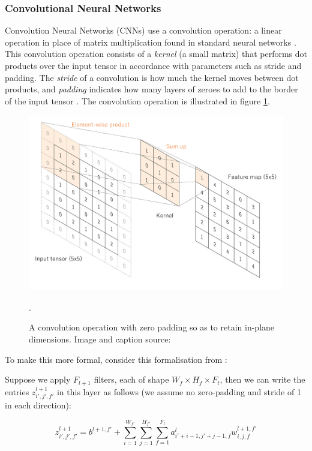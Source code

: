 \subsubsection{Convolutional Neural Networks}
Convolution Neural Networks (CNNs) use a convolution operation: a linear operation in place of matrix multiplication found in standard neural networks \cite{cnn}. This convolution operation consists of a \textit{kernel} (a small matrix) that performs dot products over the input tensor in accordance with parameters such as stride and padding. The \textit{stride} of a convolution is how much the kernel moves between dot products, and \textit{padding} indicates how many layers of zeroes to add to the border of the input tensor \cite{cnn}. The convolution operation is illustrated in figure \ref{fig:cnn}.

\begin{figure}
    \centering
    \includegraphics[scale = 0.25]{images/cnn.png}
    \caption{A convolution operation with zero padding so as to retain in-plane dimensions. Image and caption source: \cite{cnnfig}}.
    \label{fig:cnn}
\end{figure}

To make this more formal, consider this formalisation from \cite{csmlnotes}:

Suppose we apply $F_{l+1}$ filters, each of shape $W_f \times H_f \times F_t$, then we can write the entries $z_{i',j',f'}^{l+1}$ in this layer as follows (we assume no zero-padding and stride of 1 in each direction):



 \[z_{i',j',f'}^{l+1} = b^{l+1,f'} + \sum_{i=1}^{W_{f'}}\sum_{j=1}^{H_{f'}}\sum_{f=1}^{F_l}a^l_{i'+i-1,j'+j-1,f} w^{l+1,f'}_{i,j,f}
 \]
 
